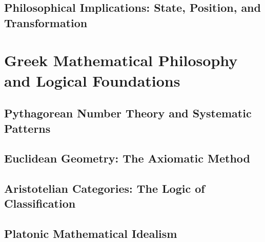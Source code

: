 \documentclass[12pt, oneside, openany]{book}
\let\oldchapter\chapter
\renewcommand{\chapter}{
	\cleardoublepage
	\thispagestyle{chapter}
	\oldchapter
}
\begin{document}
\section{Philosophical Implications: State, Position, and Transformation}


\chapter{Greek Mathematical Philosophy and Logical Foundations}

\section{Pythagorean Number Theory and Systematic Patterns}

\section{Euclidean Geometry: The Axiomatic Method}

\section{Aristotelian Categories: The Logic of Classification}

\section{Platonic Mathematical Idealism}

\end{document}
